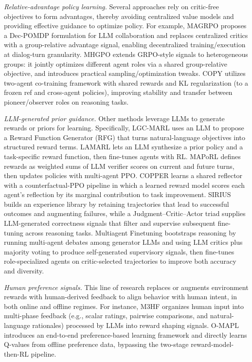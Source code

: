 \emph{Relative-advantage policy learning.}
Several approaches rely on critic-free objectives to form advantages, thereby avoiding centralized value models and providing effective guidance to optimize policy. For example,  MAGRPO \cite{liu2025llm} proposes a Dec-POMDP formulation for LLM collaboration and replaces centralized critics with a group-relative advantage signal, enabling decentralized training/execution at dialog-turn  granularity. MHGPO \cite{chen2025heterogeneous} extends GRPO-style signals to heterogeneous groups: it jointly optimizes different agent roles via a shared group-relative objective, and introduces practical sampling/optimization tweaks. COPY \cite{ma2024coevolving} utilizes two-agent co-training framework with shared rewards and KL regularization (to a frozen ref and cross-agent policies), improving stability and transfer between pioneer/observer roles on reasoning tasks.

\emph{LLM-generated prior guidance.}
Other methods leverage LLMs to generate rewards or priors for learning. Specifically, LGC-MARL \cite{jia2025enhancing} uses an LLM to propose a Reward Function Generator (RFG) that turns natural-language objectives into structured reward terms. LAMARL \cite{zhu2025lamarl} lets an LLM synthesize a prior policy and a task-specific reward function, then fine-tunes agents with RL. MAPoRL \cite{park2025maporl} defines rewards as weighted sums of LLM verifier scores on current and future turns, then updates policies with multi-agent PPO. COPPER \cite{bo2024reflective} learns a shared reflector with a counterfactual-PPO pipeline in which a learned reward model scores each agent’s reflection by its marginal contribution to task improvement. SIRIUS \cite{zhao2025sirius} builds an experience library by retaining trajectories that lead to successful outcomes and augmenting failures, while a Judgment–Critic–Actor triad supplies LLM-generated correctness signals that filter and supervise subsequent fine-tuning across reasoning tasks. Multiagent Finetuning \cite{subramaniam2025multiagent} bootstraps reasoning by running multi-agent debates among generator LLMs and using LLM critics plus majority voting to produce self-generated supervisory signals, then fine-tunes role-specialized agents on critic-selected trajectories to improve both accuracy and diversity.

\emph{Human preference signals.}
This line of research replaces or augments environment rewards with human-derived feedback to align behavior with human intent, in both online and offline regimes. For instance, M3HF \cite{wang2025m3hf} organizes human input into multi-phase feedback (e.g., scalar ratings, pairwise comparisons, and natural-language rationales) processed by LLMs into reward shaping signals. O-MAPL \cite{bui2025mapl} introduces an end-to-end preference-based learning framework and directly learns Q-values from offline preference data, bypassing the two-stage reward-model-then-RL pipeline. 


